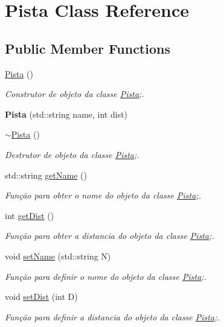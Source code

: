 \hypertarget{class_pista}{}\section{Pista Class Reference}
\label{class_pista}
\subsection*{Public Member Functions}
\begin{DoxyCompactItemize}
\item 
\mbox{\hyperlink{class_pista_a0ac128160ae609df4adcc5a7a41213ba}{Pista}} ()
\begin{DoxyCompactList}\small\item\em Construtor de objeto da classe \mbox{\hyperlink{class_pista}{Pista}};. \end{DoxyCompactList}\item 
\mbox{\label{class_pista_a0a43856a5ae273d063ee06f6e88ca9d9}} 
{\bfseries Pista} (std\+::string name, int dist)
\item 
\mbox{\hyperlink{class_pista_ad6f5c470d1ef5976697058ce42ed26bc}{$\sim$\+Pista}} ()
\begin{DoxyCompactList}\small\item\em Destrutor de objeto da classe \mbox{\hyperlink{class_pista}{Pista}};. \end{DoxyCompactList}\item 
std\+::string \mbox{\hyperlink{class_pista_a2d9890351396ff2d9bc6b0e020279a80}{get\+Name}} ()
\begin{DoxyCompactList}\small\item\em Função para obter o nome do objeto da classe \mbox{\hyperlink{class_pista}{Pista}};. \end{DoxyCompactList}\item 
int \mbox{\hyperlink{class_pista_aa8cdca9f84ad837b93557fbea30c1dd4}{get\+Dist}} ()
\begin{DoxyCompactList}\small\item\em Função para obter a distancia do objeto da classe \mbox{\hyperlink{class_pista}{Pista}};. \end{DoxyCompactList}\item 
void \mbox{\hyperlink{class_pista_a39cca8d8b1504352bc1965bb5e82f9e6}{set\+Name}} (std\+::string N)
\begin{DoxyCompactList}\small\item\em Função para definir o nome do objeto da classe \mbox{\hyperlink{class_pista}{Pista}};. \end{DoxyCompactList}\item 
void \mbox{\hyperlink{class_pista_add070183d3928d180ce20446d7c0894a}{set\+Dist}} (int D)
\begin{DoxyCompactList}\small\item\em Função para definir a distancia do objeto da classe \mbox{\hyperlink{class_pista}{Pista}};. \end{DoxyCompactList}\end{DoxyCompactItemize}


